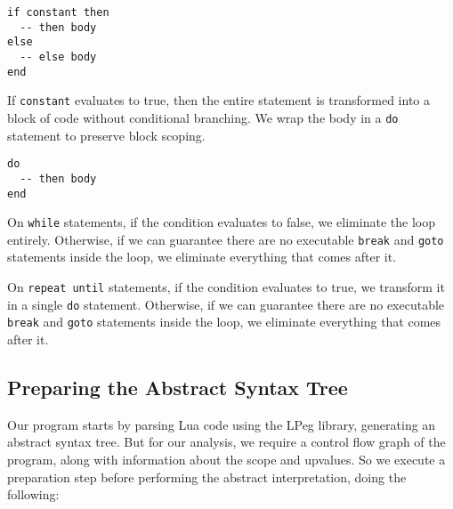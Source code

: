 \documentclass[
]{article}
\begin{document}
\begin{verbatim}
if constant then
  -- then body
else
  -- else body
end
\end{verbatim}

If \texttt{constant} evaluates to true, then the entire statement is
transformed into a block of code without conditional branching. We wrap
the body in a \texttt{do} statement to preserve block scoping.

\begin{verbatim}
do
  -- then body
end
\end{verbatim}

On \texttt{while} statements, if the condition evaluates to false, we
eliminate the loop entirely. Otherwise, if we can guarantee there are no
executable \texttt{break} and \texttt{goto} statements inside the loop,
we eliminate everything that comes after it.

On \texttt{repeat\ until} statements, if the condition evaluates to
true, we transform it in a single \texttt{do} statement. Otherwise, if
we can guarantee there are no executable \texttt{break} and
\texttt{goto} statements inside the loop, we eliminate everything that
comes after it.

\hypertarget{preparing-the-abstract-syntax-tree}{%
\subsection{Preparing the Abstract Syntax
Tree}\label{preparing-the-abstract-syntax-tree}}

Our program starts by parsing Lua code using the LPeg library,
generating an abstract syntax tree. But for our analysis, we require a
control flow graph of the program, along with information about the
scope and upvalues. So we execute a preparation step before performing
the abstract interpretation, doing the following:
\end{document}
